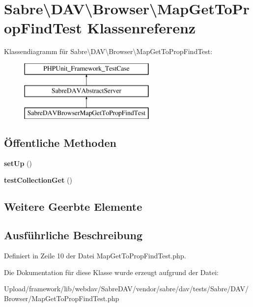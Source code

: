 \hypertarget{class_sabre_1_1_d_a_v_1_1_browser_1_1_map_get_to_prop_find_test}{}\section{Sabre\textbackslash{}D\+AV\textbackslash{}Browser\textbackslash{}Map\+Get\+To\+Prop\+Find\+Test Klassenreferenz}
\label{class_sabre_1_1_d_a_v_1_1_browser_1_1_map_get_to_prop_find_test}
Klassendiagramm für Sabre\textbackslash{}D\+AV\textbackslash{}Browser\textbackslash{}Map\+Get\+To\+Prop\+Find\+Test\+:\begin{figure}[H]
\begin{center}
\leavevmode
\includegraphics[height=3.000000cm]{class_sabre_1_1_d_a_v_1_1_browser_1_1_map_get_to_prop_find_test}
\end{center}
\end{figure}
\subsection*{Öffentliche Methoden}
\begin{DoxyCompactItemize}
\item 
\mbox{\label{class_sabre_1_1_d_a_v_1_1_browser_1_1_map_get_to_prop_find_test_a887382aa4cfacedbbd4a1bd3adb54fe9}} 
{\bfseries set\+Up} ()
\item 
\mbox{\label{class_sabre_1_1_d_a_v_1_1_browser_1_1_map_get_to_prop_find_test_a75e030ad8aef0d5aeb26a85b1af0bf9b}} 
{\bfseries test\+Collection\+Get} ()
\end{DoxyCompactItemize}
\subsection*{Weitere Geerbte Elemente}


\subsection{Ausführliche Beschreibung}


Definiert in Zeile 10 der Datei Map\+Get\+To\+Prop\+Find\+Test.\+php.



Die Dokumentation für diese Klasse wurde erzeugt aufgrund der Datei\+:\begin{DoxyCompactItemize}
\item 
Upload/framework/lib/webdav/\+Sabre\+D\+A\+V/vendor/sabre/dav/tests/\+Sabre/\+D\+A\+V/\+Browser/Map\+Get\+To\+Prop\+Find\+Test.\+php\end{DoxyCompactItemize}
